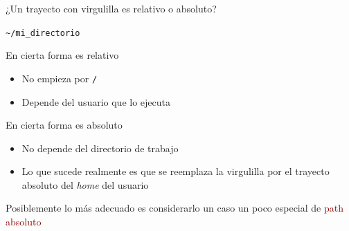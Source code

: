 \documentclass[ucs]{beamer}
\newcommand{\res}[1]{\textcolor{darkred}{#1}}
\begin{document}
\begin{frame}[fragile]
¿Un trayecto con virgulilla es relativo o absoluto?

\verb|~/mi_directorio|

En cierta forma es relativo
\begin{itemize}
\item
No empieza por \verb|/|
\item
Depende del usuario que lo ejecuta
\end{itemize}

En cierta forma es absoluto
\begin{itemize}
\item
No depende del directorio de trabajo
\item
Lo que sucede realmente es que se reemplaza la virgulilla por el trayecto
absoluto del \emph{home} del usuario
\end{itemize}

Posiblemente lo más adecuado es considerarlo un caso un poco
especial de \res{path absoluto}


\end{frame}
\end{document}
